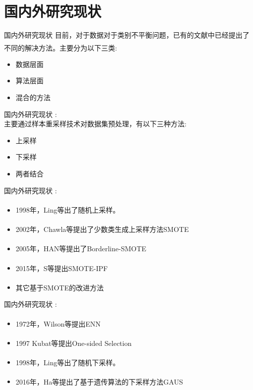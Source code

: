 \documentclass{beamer}
\newcommand{\upcite}[1]{\textsuperscript{\textsuperscript{\cite{#1}}}} %
\begin{document}
\section{国内外研究现状}
\begin{frame}{国内外研究现状}\pause
    目前，对于数据对于类别不平衡问题，已有的文献中已经提出了不同的解决方法。主要分为以下三类\upcite{spelmen2018review}:
    \begin{itemize}
        \item 数据层面
        \item 算法层面
        \item 混合的方法
    \end{itemize}    
\end{frame}

\begin{frame}{国内外研究现状}\pause
    :\\
    主要通过样本重采样技术对数据集预处理，有以下三种方法:
    \begin{itemize}
        \item 上采样
        \item 下采样
        \item 两者结合
    \end{itemize}
\end{frame}

\begin{frame}{国内外研究现状}\pause
    :\\
    \begin{itemize}
        \item 
        1998年，Ling等\upcite{ling1998data}出了随机上采样。
        \item 
        2002年，Chawla等\upcite{chawla2002smote}提出了少数类生成上采样方法SMOTE
        \item  
        2005年，HAN等\upcite{han2005borderline}提出了Borderline-SMOTE
        \item  
        2015年，S等\upcite{saez2015smote}提出SMOTE-IPF
        \item  
        其它基于SMOTE的改进方法\upcite{hu2009msmote, ali2019imbalance}
    \end{itemize}
    
\end{frame}

\begin{frame}{国内外研究现状}\pause
    :\\
    \begin{itemize}
        \item  
        1972年，Wilson等\upcite{wilson1972asymptotic}提出ENN
        \item 
        1997 Kubat等\upcite{kubat1997addressing}提出One-sided Selection
        \item 
        1998年，Ling等\upcite{ling1998data}出了随机下采样。
        \item 
        2016年，Ha等\upcite{ha2016new}提出了基于遗传算法的下采样方法GAUS 
    \end{itemize}
    
\end{frame}
\end{document}
